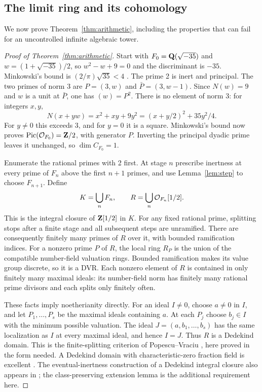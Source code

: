 \subsection{The limit ring and its cohomology}
We now prove Theorem~\ref{thm:arithmetic}, including the properties
that can fail for an uncontrolled infinite algebraic tower.

\begin{proof}[Proof of Theorem~\ref{thm:arithmetic}]
Start with $F_0=\mathbf Q(\sqrt{-35})$ and
$w=(1+\sqrt{-35})/2$, so $w^2-w+9=0$ and the discriminant is
$-35$. Minkowski's bound is $(2/\pi)\sqrt{35}<4$
\cite[Theorem 4.3, pp.~70--71]{MilneANT}. The prime 2 is inert
and principal. The two primes of norm 3 are
$P=(3,w)$ and $\bar P=(3,w-1)$. Since $N(w)=9$ and $w$ is
a unit at $\bar P$, one has $(w)=P^2$. There is no element of
norm 3: for integers $x,y$,
\[
 N(x+yw)=x^2+xy+9y^2
       =(x+y/2)^2+35y^2/4.
\]
For $y\ne0$ this exceeds 3, and for $y=0$ it is a square.
Minkowski's bound now proves $\operatorname{Pic}(\mathcal O_{F_0})=\mathbf Z/2$, with
generator $P$. Inverting the principal dyadic prime leaves it
unchanged, so $\dim C_{F_0}=1$.

Enumerate the rational primes with 2 first. At stage $n$ prescribe
inertness at every prime of $F_n$ above the first $n+1$ primes,
and use Lemma~\ref{lem:step} to choose $F_{n+1}$. Define
\[
 K=\bigcup_nF_n,\qquad R=\bigcup_n\mathcal O_{F_n}[1/2].
\]
This is the integral closure of $\mathbf Z[1/2]$ in $K$. For any fixed
rational prime, splitting stops after a finite stage and all
subsequent steps are unramified. There are consequently finitely
many primes of $R$ over it, with bounded ramification indices.
For a nonzero prime $P$ of $R$, the local ring $R_P$ is the
union of the compatible number-field valuation rings. Bounded
ramification makes its value group discrete, so it is a DVR.
Each nonzero element of $R$ is contained in only finitely many
maximal ideals: its number-field norm has finitely many rational
prime divisors and each splits only finitely often.

These facts imply noetherianity directly. For an ideal $I\ne0$,
choose $a\ne0$ in $I$, and let $P_1,\ldots,P_s$ be the maximal
ideals containing $a$. At each $P_j$ choose $b_j\in I$ with
the minimum possible valuation. The ideal
$J=(a,b_1,\ldots,b_s)$ has the same localization as $I$ at every
maximal ideal, and hence $I=J$. Thus $R$ is a Dedekind domain.
This is the finite-splitting criterion of Popescu--Vraciu
\cite[pp.~40--42]{PopescuVraciu}, here proved in the form needed.
A Dedekind domain with characteristic-zero fraction field is
excellent \cite[Tag 07QS, Proposition 15.53.3(4)]{Stacks}.
The eventual-inertness construction of a Dedekind integral closure
also appears in \cite[\S5, pp.~511--512]{Popescu2022}; the
class-preserving extension lemma is the additional requirement here.


\end{proof}
